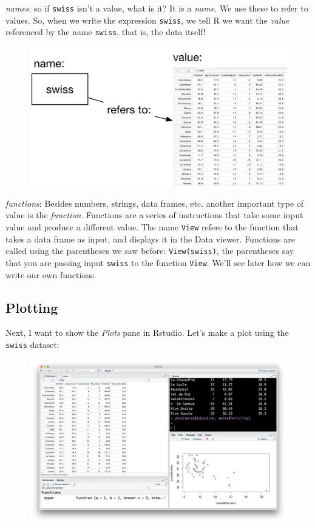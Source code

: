 \documentclass[]{book}
\theoremstyle{definition}
\theoremstyle{definition}
\theoremstyle{remark}
\begin{document}
\emph{names}: so if \texttt{swiss} isn't a value, what is it? It is a
\emph{name}. We use these to refer to values. So, when we write the
expression \texttt{swiss}, we tell R we want the \emph{value} referenced
by the name \texttt{swiss}, that is, the data itself!

\begin{figure}
\centering
\includegraphics{img/names_values.png}
\caption{}
\end{figure}

\emph{functions}: Besides numbers, strings, data frames, etc. another
important type of value is the \emph{function}. Functions are a series
of instructions that take some input value and produce a different
value. The name \texttt{View} refers to the function that takes a data
frame as input, and displays it in the Data viewer. Functions are called
using the parentheses we saw before: \texttt{View(swiss)}, the
parentheses say that you are passing input \texttt{swiss} to the
function \texttt{View}. We'll see later how we can write our own
functions.

\subsection{Plotting}\label{plotting}

Next, I want to show the \emph{Plots} pane in Rstudio. Let's make a plot
using the \texttt{swiss} dataset:

\begin{figure}
\centering
\includegraphics{img/rstudio_plot_swiss.png}
\caption{}
\end{figure}
\end{document}

